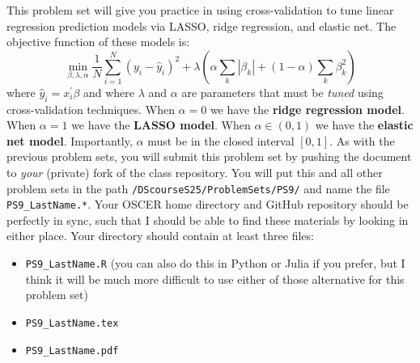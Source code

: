 \documentclass[12pt,english]{exam}
\begin{document}
This problem set will give you practice in using cross-validation to tune linear regression prediction models via LASSO, ridge regression, and elastic net.
The objective function of these models is:
\[
    \min_{\beta,\lambda,\alpha} \frac{1}{N}\sum_{i=1}^{N}\left(y_{i} - \hat{y}_{i}\right)^2 + \lambda\left(\alpha\sum_{k}\left| \beta_{k}\right| + \left(1-\alpha\right)\sum_{k}\beta_{k}^{2}\right)
\]
where $\hat{y}_{i} = x_{i}^{\prime}\beta$ and where $\lambda$ and $\alpha$ are parameters that must be \emph{tuned} using cross-validation techniques.
When $\alpha=0$ we have the \textbf{ridge regression model}. When $\alpha=1$ we have the \textbf{LASSO model}. When $\alpha\in\left(0,1\right)$ we have the \textbf{elastic net model}. Importantly, $\alpha$ must be in the closed interval $\left[0,1\right]$.
As with the previous problem sets, you will submit this problem set by pushing the document to \emph{your} (private) fork of the class repository. You will put this and all other problem sets in the path \texttt{/DScourseS25/ProblemSets/PS9/} and name the file \texttt{PS9\_LastName.*}. Your OSCER home directory and GitHub repository should be perfectly in sync, such that I should be able to find these materials by looking in either place. Your directory should contain at least three files:
\begin{itemize}
    \item \texttt{PS9\_LastName.R} (you can also do this in Python or Julia if you prefer, but I think it will be much more difficult to use either of those alternative for this problem set)
    \item \texttt{PS9\_LastName.tex}
    \item \texttt{PS9\_LastName.pdf}
\end{itemize}
\end{document}
